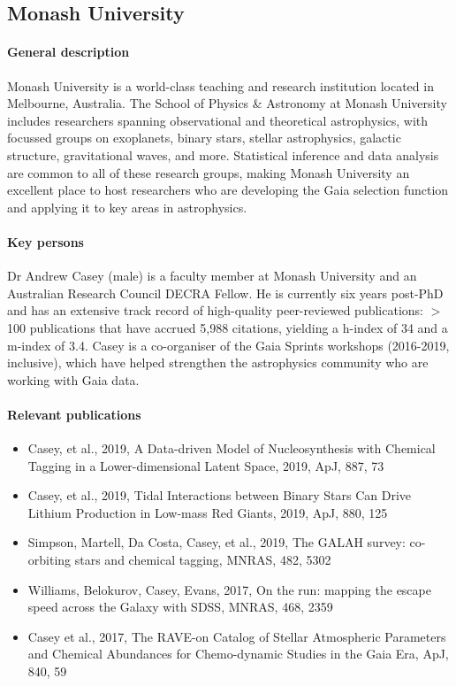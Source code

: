 \subsection{Monash University}
\label{sec:mona}

\paragraph{General description}
Monash University is a world-class teaching and research institution located in Melbourne, Australia. The School of Physics \& Astronomy at Monash University includes researchers spanning observational and theoretical astrophysics, with focussed groups on exoplanets, binary stars, stellar astrophysics, galactic structure, gravitational waves, and more. Statistical inference and data analysis are common to all of these research groups, making Monash University an excellent place to host researchers who are developing the Gaia selection function and applying it to key areas in astrophysics.

\paragraph{Key persons}
Dr Andrew Casey (male) is a faculty member at Monash University and an Australian Research Council DECRA Fellow. He is currently six years post-PhD and has an extensive track record of high-quality peer-reviewed publications: $>$100 publications that have accrued 5,988 citations, yielding a h-index of 34 and a m-index of 3.4. Casey is a co-organiser of the Gaia Sprints workshops (2016-2019, inclusive), which have helped strengthen the astrophysics community who are working with Gaia data.


\paragraph{Relevant publications}
\begin{itemize}
	\item Casey, et al., 2019, A Data-driven Model of Nucleosynthesis with Chemical Tagging in a Lower-dimensional Latent Space, 2019, ApJ, 887, 73
	\item Casey, et al., 2019, Tidal Interactions between Binary Stars Can Drive Lithium Production in Low-mass Red Giants, 2019, ApJ, 880, 125
	\item Simpson, Martell, Da Costa, Casey, et al., 2019, The GALAH survey: co-orbiting stars and chemical tagging, MNRAS, 482, 5302
	\item Williams, Belokurov, Casey, Evans, 2017, On the run: mapping the escape speed across the Galaxy with SDSS, MNRAS, 468, 2359
	\item Casey et al., 2017, The RAVE-on Catalog of Stellar Atmospheric Parameters and Chemical Abundances for Chemo-dynamic Studies in the Gaia Era, ApJ, 840, 59
\end{itemize}

